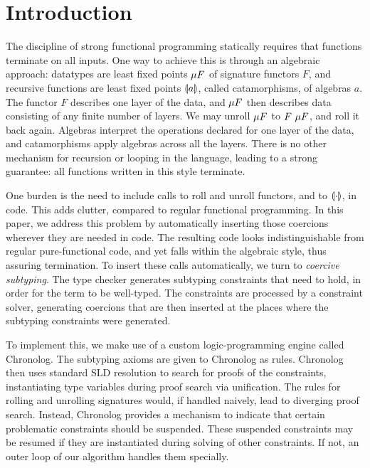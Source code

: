 \documentclass[pdflatex,sn-mathphys-num]{sn-jnl}%
\theoremstyle{thmstyleone}%
\theoremstyle{thmstyletwo}%
\theoremstyle{thmstylethree}%
\begin{document}
\section{Introduction} %


The discipline of strong functional programming statically requires
that functions terminate on all inputs.  One way to achieve this is
through an algebraic approach: datatypes are least fixed points
$\mu F$ of signature functors $F$, and recursive functions are least
fixed points $\llparenthesis a \rrparenthesis$, called catamorphisms, of algebras $a$.  The
functor $F$ describes one layer of the data, and $\mu F$ then
describes data consisting of any finite number of layers.  We may
unroll $\mu F$ to $F ~ \mu F$, and roll it back
again.  Algebras interpret the operations declared for one layer of
the data, and catamorphisms apply algebras across all the layers.
There is no other mechanism for recursion or looping in the language,
leading to a strong guarantee: all functions written in this style
terminate.

One burden is the need to include calls to roll and unroll functors,
and to $\llparenthesis \cdot \rrparenthesis$, in code.  This adds clutter, compared to regular
functional programming.  In this paper, we address this problem by
automatically inserting those coercions wherever they are needed in
code.  The resulting code looks indistinguishable from regular
pure-functional code, and yet falls within the algebraic style, thus
assuring termination.  To insert these calls automatically, we turn to
\emph{coercive subtyping}.  The type checker generates subtyping
constraints that need to hold, in order for the term to be well-typed.
The constraints are processed by a constraint solver, generating
coercions that are then inserted at the places where the subtyping
constraints were generated.

To implement this, we make use of a custom logic-programming engine
called Chronolog.  The subtyping axioms are given to Chronolog as
rules.  Chronolog then uses standard SLD resolution to search for
proofs of the constraints, instantiating type variables during proof
search via unification.  The rules for rolling and unrolling
signatures would, if handled naively, lead to diverging proof search.
Instead, Chronolog provides a mechanism to indicate that certain
problematic constraints should be suspended.  These suspended constraints may be
resumed if they are instantiated during solving of other constraints.
If not, an outer loop of our algorithm handles them specially.
\end{document}
